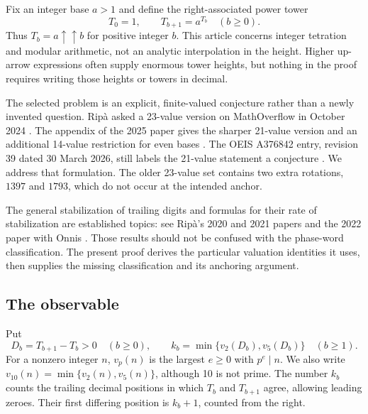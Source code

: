 \documentclass[11pt,letterpaper]{article}
\numberwithin{equation}{section}
\theoremstyle{definition}
\begin{document}
Fix an integer base $a>1$ and define the right-associated power tower
\begin{equation}\label{eq:tower}
 T_0=1,\qquad T_{b+1}=a^{T_b}\quad(b\geq0).
\end{equation}
Thus $T_b=a\uparrow\uparrow b$ for positive integer $b$. This article concerns
integer tetration and modular arithmetic, not an analytic interpolation in the
height. Higher up-arrow expressions often supply enormous tower heights, but
nothing in the proof requires writing those heights or towers in decimal.

The selected problem is an explicit, finite-valued conjecture rather than a
newly invented question. Rip\`a asked a 23-value version on MathOverflow in
October 2024 \cite{mo}. The appendix of the 2025 paper gives the sharper
21-value version and an additional 14-value restriction for even bases
\cite{ripa2025}. The OEIS A376842 entry, revision 39 dated 30 March 2026,
still labels the 21-value statement a conjecture \cite{oeis842}. We address
that formulation. The older 23-value set contains two extra rotations,
$1397$ and $1793$, which do not occur at the intended anchor.

The general stabilization of trailing digits and formulas for their rate of
stabilization are established topics: see Rip\`a's 2020 and 2021 papers and the
2022 paper with Onnis \cite{ripa2020,ripa2021,ripaonnis}. Those results should
not be confused with the phase-word classification. The present proof derives
the particular valuation identities it uses, then supplies the missing
classification and its anchoring argument.

\subsection{The observable}
Put
\begin{equation}\label{eq:difference}
 D_b=T_{b+1}-T_b>0\quad(b\geq0),\qquad
 k_b=\min\{v_2(D_b),v_5(D_b)\}\quad(b\geq1).
\end{equation}
For a nonzero integer $n$, $v_p(n)$ is the largest $e\geq0$ with $p^e\mid n$.
We also write $v_{10}(n)=\min\{v_2(n),v_5(n)\}$, although 10 is not prime.
The number $k_b$ counts the trailing decimal positions in which $T_b$ and
$T_{b+1}$ agree, allowing leading zeroes. Their first differing position is
$k_b+1$, counted from the right.
\end{document}
